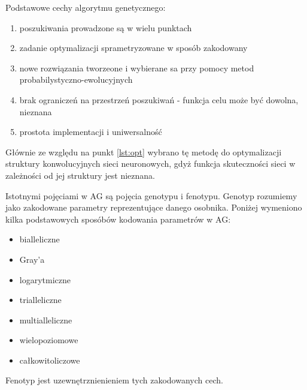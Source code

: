 Podstawowe cechy algorytmu genetycznego:
\begin{enumerate}
	\item poszukiwania prowadzone są w wielu punktach
	\item zadanie optymalizacji sprametryzowane w sposób zakodowany
	\item nowe rozwiązania tworzeone i wybierane sa przy pomocy metod probabilystyczno-ewolucyjnych
	\item brak ograniczeń na przestrzeń poszukiwań - funkcja celu może być dowolna, nieznana \label{lst:opt}
	\item prostota implementacji i uniwersalność
\end{enumerate}

Głównie ze względu na punkt \ref{lst:opt} wybrano tę metodę do optymalizacji struktury konwolucyjnych sieci neuronowych, gdyż funkcja skuteczności sieci w zależności od jej struktury jest nieznana.

Istotnymi pojęciami w AG są pojęcia genotypu i fenotypu.
Genotyp rozumiemy jako zakodowane parametry reprezentujące danego osobnika.
Poniżej wymeniono kilka podstawowych sposóbów kodowania parametrów w AG:
\begin{itemize}
	\item bialleliczne
	\item Gray’a
	\item logarytmiczne
	\item trialleliczne
	\item multialleliczne
	\item wielopoziomowe
	\item całkowitoliczowe
\end{itemize}
Fenotyp jest uzewnętrznienieniem tych zakodowanych cech.

